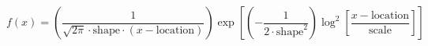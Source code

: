 \documentclass[preview]{standalone}
\begin{document}
\begin{equation*}
f(x) = \left( \frac{1}{\sqrt{2\pi} \cdot \mathrm{shape} \cdot \left( x - \mathrm{location} \right)} \right)\exp{\left[ \left( -\frac{1}{2 \cdot \mathrm{shape}^2} \right)\log^2{\left[ \frac{x - \mathrm{location}}{\mathrm{scale}} \right]} \right]}
\end{equation*}
\end{document}
